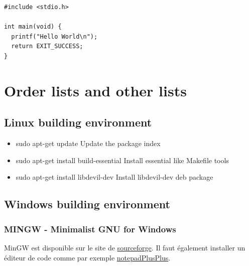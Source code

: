 \documentclass[12pt]{article}
\begin{document}
 
\begin{lstlisting}
#include <stdio.h>
 
int main(void) {
  printf("Hello World\n");
  return EXIT_SUCCESS;
}
\end{lstlisting}

\newpage
\section{Order lists and other lists}

\subsection{Linux building environment}
\begin{itemize} [label=\textbullet, font=\small \color{blue}]
\item sudo apt-get update \tabto{8cm} Update the package index
\item sudo apt-get install build-essential  \tabto{8cm} Install essential like Makefile tools
\item sudo apt-get install libdevil-dev \tabto{8cm} Install libdevil-dev deb package


\end{itemize}

\subsection{Windows building environment}

\subsubsection{MINGW - Minimalist GNU for Windows}
MinGW est disponible sur le site de \href{https://sourceforge.net/projects/mingw/}{sourceforge}. Il faut également installer un éditeur de code comme par exemple \href{https://notepad-plus-plus.org/download/v7.6.3.html}{notepadPlusPlus}.\\
\end{document}
